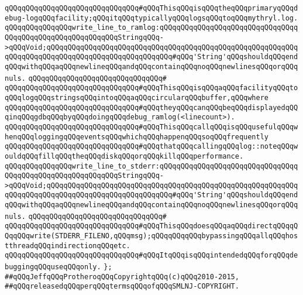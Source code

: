 \verb|qQQqqQQqqQQqqQQqqQQqqQQqqQQqqQQq#qQQqThisqQQqisqQQqtheqQQqprimaryqQQqdebug-logqQQqfacility;qQQqitqQQqtypicallyqQQqlogsqQQqtoqQQqmythryl.log.|\newline
\newline
\verb|qQQqqQQqqQQqqQQqwrite_line_to_ramlog:qQQqqQQqqQQqqQQqqQQqqQQqqQQqqQQqqQQqqQQqqQQqqQQqqQQqqQQqqQQqStringqQQq->qQQqVoid;qQQqqQQqqQQqqQQqqQQqqQQqqQQqqQQqqQQqqQQqqQQqqQQqqQQqqQQqqQQqqQQqqQQqqQQqqQQqqQQqqQQqqQQqqQQqqQQqqQQq#qQQq'String'qQQqshouldqQQqendqQQqwithqQQqaqQQqnewlineqQQqandqQQqcontainqQQqnoqQQqnewlinesqQQqorqQQqnuls.|\newline
\verb|qQQqqQQqqQQqqQQqqQQqqQQqqQQqqQQq#|\newline
\verb|qQQqqQQqqQQqqQQqqQQqqQQqqQQqqQQq#qQQqThisqQQqisqQQqaqQQqfacilityqQQqtoqQQqlogqQQqstringsqQQqintoqQQqaqQQqcircularqQQqbuffer,qQQqwhere|\newline
\verb|qQQqqQQqqQQqqQQqqQQqqQQqqQQqqQQq#qQQqtheyqQQqcanqQQqbeqQQqdisplayedqQQqinqQQqgdbqQQqbyqQQqdoingqQQqdebug_ramlog(<linecount>).|\newline
\verb|qQQqqQQqqQQqqQQqqQQqqQQqqQQqqQQq#qQQqThisqQQqcallqQQqisqQQqusefulqQQqwhenqQQqloggingqQQqeventsqQQqwhichqQQqhappenqQQqsoqQQqfrequently|\newline
\verb|qQQqqQQqqQQqqQQqqQQqqQQqqQQqqQQq#qQQqthatqQQqcallingqQQqlog::noteqQQqwouldqQQqfillqQQqtheqQQqdiskqQQqorqQQqkillqQQqperformance.|\newline
\newline
\verb|qQQqqQQqqQQqqQQqwrite_line_to_stderr:qQQqqQQqqQQqqQQqqQQqqQQqqQQqqQQqqQQqqQQqqQQqqQQqqQQqqQQqqQQqStringqQQq->qQQqVoid;qQQqqQQqqQQqqQQqqQQqqQQqqQQqqQQqqQQqqQQqqQQqqQQqqQQqqQQqqQQqqQQqqQQqqQQqqQQqqQQqqQQqqQQqqQQqqQQqqQQq#qQQq'String'qQQqshouldqQQqendqQQqwithqQQqaqQQqnewlineqQQqandqQQqcontainqQQqnoqQQqnewlinesqQQqorqQQqnuls.|\newline
\verb|qQQqqQQqqQQqqQQqqQQqqQQqqQQqqQQq#|\newline
\verb|qQQqqQQqqQQqqQQqqQQqqQQqqQQqqQQq#qQQqThisqQQqdoesqQQqaqQQqdirectqQQqqQQqqQQqwrite(STDERR_FILENO,qQQqmsg);qQQqqQQqqQQqbypassingqQQqallqQQqhostthreadqQQqindirectionqQQqetc.|\newline
\verb|qQQqqQQqqQQqqQQqqQQqqQQqqQQqqQQq#qQQqItqQQqisqQQqintendedqQQqforqQQqdebuggingqQQquseqQQqonly.|\newline
\verb|};|\newline
\newline
\newline
\newline
\verb|##qQQqJeffqQQqProtheroqQQqCopyrightqQQq(c)qQQq2010-2015,|\newline
\verb|##qQQqreleasedqQQqperqQQqtermsqQQqofqQQqSMLNJ-COPYRIGHT.|\newline

